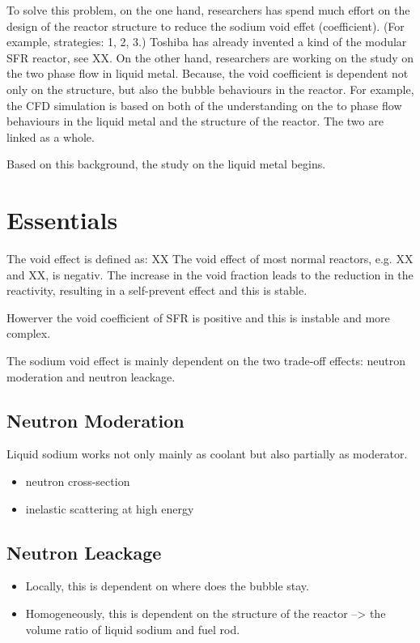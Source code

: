 \documentclass[11pt]{article}
\begin{document}
To solve this problem, on the one hand, researchers has spend much effort on the design of the reactor structure to reduce the sodium void effet (coefficient). (For example, strategies: 1, 2, 3.) Toshiba has already invented a kind of the modular SFR reactor, see XX. On the other hand, researchers are working on the study on the two phase flow in liquid metal. Because, the void coefficient is dependent not only on the structure, but also the bubble behaviours in the reactor. For example, the CFD simulation is based on both of the understanding on the to phase flow behaviours in the liquid metal and the structure of the reactor. The two are linked as a whole.

Based on this background, the study on the liquid metal begins.

\section{Essentials}
\label{sec:orgb477fa3}
The void effect is defined as:
                    XX
The void effect of most normal reactors, e.g. XX and XX, is negativ. The increase in the void fraction leads to the reduction in the reactivity, resulting in a self-prevent effect and this is stable.

Howerver the void coefficient of SFR is positive and this is instable and more complex.

The sodium void effect is mainly dependent on the two trade-off effects: neutron moderation and neutron leackage.

\subsection{Neutron Moderation}
\label{sec:orgd9f1e8a}
Liquid sodium works not only mainly as coolant but also partially as moderator.
\begin{itemize}
\item neutron cross-section
\item inelastic scattering at high energy
\end{itemize}
\subsection{Neutron Leackage}
\label{sec:org87c235a}
\begin{itemize}
\item Locally, this is dependent on where does the bubble stay.
\item Homogeneously, this is dependent on the structure of the reactor --> the volume ratio of liquid sodium and fuel rod.
\end{itemize}
\end{document}
